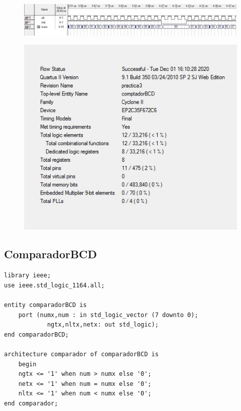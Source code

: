 \documentclass[12pt, a4papre]{article}
\begin{document}
				
\begin{figure}[H]
		\begin{center}
		\includegraphics[width=130mm]{simulacioComptador.jpeg}
		\end{center}
	\end{figure}
\begin{figure}[H]
		\begin{center}
		\includegraphics[width=130mm]{informeComptador.jpeg}
		\end{center}
	\end{figure}
	
	
\subsection{ComparadorBCD}


		
	\begin{lstlisting}[style=vhdl, frame=single, basicstyle=\tiny]
	library ieee;
use ieee.std_logic_1164.all;

entity comparadorBCD is 
	port (numx,num : in std_logic_vector (7 downto 0);
			ngtx,nltx,netx: out std_logic);
end comparadorBCD;

architecture comparador of comparadorBCD is 
	begin
	ngtx <= '1' when num > numx else '0';
	netx <= '1' when num = numx else '0';
	nltx <= '1' when num < numx else '0';
end comparador;
	
		\end{lstlisting}
\end{document}
